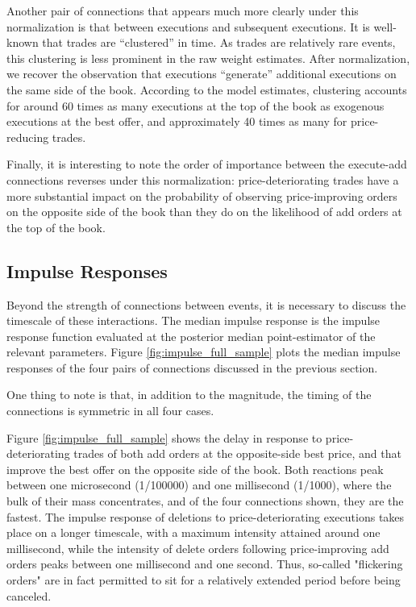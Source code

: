 Another pair of connections that appears much more clearly under this normalization is that between executions and subsequent executions. It is well-known that trades are “clustered” in time. As trades are relatively rare events, this clustering is less prominent in the raw weight estimates. After normalization, we recover the observation that executions “generate” additional executions on the same side of the book. According to the model estimates, clustering accounts for around 60 times as many executions at the top of the book as exogenous executions at the best offer, and approximately 40 times as many for price-reducing trades.

Finally, it is interesting to note the order of importance between the execute-add connections reverses under this normalization: price-deteriorating trades have a more substantial impact on the probability of observing price-improving orders on the opposite side of the book than they do on the likelihood of add orders at the top of the book.

\subsection{Impulse Responses}
Beyond the strength of connections between events, it is necessary to discuss the timescale of these interactions. The median impulse response is the impulse response function evaluated at the posterior median point-estimator of the relevant parameters. Figure \ref{fig:impulse_full_sample} plots the median impulse responses of the four pairs of connections discussed in the previous section.

One thing to note is that, in addition to the magnitude, the timing of the connections is symmetric in all four cases.

Figure \ref{fig:impulse_full_sample} shows the delay in response to price-deteriorating trades of both add orders at the opposite-side best price, and that improve the best offer on the opposite side of the book. Both reactions peak between one microsecond (1/100000) and one millisecond (1/1000), where the bulk of their mass concentrates, and of the four connections shown, they are the fastest. The impulse response of deletions to price-deteriorating executions takes place on a longer timescale, with a maximum intensity attained around one millisecond, while the intensity of delete orders following price-improving add orders peaks between one millisecond and one second. Thus, so-called "flickering orders" are in fact permitted to sit for a relatively extended period before being canceled.

